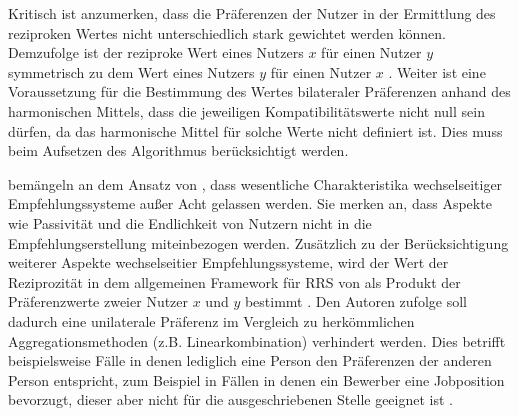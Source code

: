 Kritisch ist anzumerken, dass die Präferenzen der Nutzer in der Ermittlung des reziproken Wertes nicht unterschiedlich stark gewichtet werden können.
Demzufolge ist der reziproke Wert eines Nutzers $x$ für einen Nutzer $y$ symmetrisch zu dem Wert eines Nutzers $y$ für einen Nutzer $x$ \cite[S. 211]{pizzato:2010}.
Weiter ist eine Voraussetzung für die Bestimmung des Wertes bilateraler Präferenzen anhand des harmonischen Mittels, dass die jeweiligen Kompatibilitätswerte nicht null sein dürfen, da das harmonische Mittel für solche Werte nicht definiert ist.
Dies muss beim Aufsetzen des Algorithmus berücksichtigt werden.

\textcite[S. 40]{li:inproceedings} bemängeln an dem Ansatz von \textcite[S. 207ff.]{pizzato:2010}, dass wesentliche Charakteristika wechselseitiger Empfehlungssysteme außer Acht gelassen werden.
Sie merken an, dass Aspekte wie Passivität und die Endlichkeit von Nutzern nicht in die Empfehlungserstellung miteinbezogen werden.
Zusätzlich zu der Berücksichtigung weiterer Aspekte wechselseitier Empfehlungssysteme, wird der Wert der Reziprozität in dem allgemeinen Framework für \ac{RRS} von \textcite[S. 38]{li:inproceedings} als Produkt der Präferenzwerte zweier Nutzer $x$ und $y$ bestimmt \cite[S. 710]{kumari:article}.
Den Autoren zufolge soll dadurch eine unilaterale Präferenz im Vergleich zu herkömmlichen Aggregationsmethoden (z.B. Linearkombination) verhindert werden.
Dies betrifft beispielsweise Fälle in denen lediglich eine Person den Präferenzen der anderen Person entspricht, zum Beispiel in Fällen in denen ein Bewerber eine Jobposition bevorzugt, dieser aber nicht für die ausgeschriebenen Stelle geeignet ist \cite[S. 38]{li:inproceedings}.


